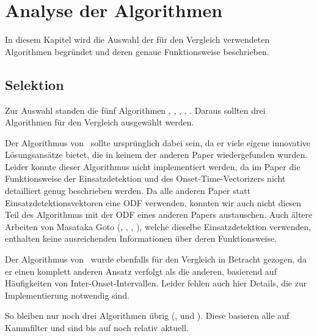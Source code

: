 \chapter{Analyse der Algorithmen}
\label{analyse}
\acresetall

In diesem Kapitel wird die Auswahl der für den Vergleich verwendeten Algorithmen begründet
	und deren genaue Funktionsweise beschrieben.

\section{Selektion}
{
	Zur Auswahl standen die fünf Algorithmen \cite{2000_Di}, \cite{2001_Go}, \cite{2001_BeatThis}, \cite{2009_DaPlSt}, \cite{2011_PlRoSt}.
	Daraus sollten drei Algorithmen für den Vergleich ausgewählt werden.

	Der Algorithmus von~\cite{2001_Go} sollte ursprünglich dabei sein,
		da er viele eigene innovative Lösungsansätze bietet,
		die in keinem der anderen Paper wiedergefunden wurden.
	Leider konnte dieser Algorithmus nicht implementiert werden,
		da im Paper die Funktionsweise der Einsatzdetektion und des Onset-Time-Vectorizers
		nicht detailliert genug beschrieben werden.
	Da alle anderen Paper statt Einsatzdetektionsvektoren eine \ac{ODF} verwenden,
		konnten wir auch nicht diesen Teil des Algorithmus mit der \ac{ODF} eines anderen Papers austauschen.
	Auch ältere Arbeiten von Masataka Goto (\cite{1994_GoMu}, \cite{1995_GoMu1}, \cite{1996_GoMu}, \cite{1997_GoMu2}),
		welche dieselbe Einsatzdetektion verwenden,
		enthalten keine ausreichenden Informationen über deren Funktionsweise.

	Der Algorithmus von~\cite{2000_Di} wurde ebenfalls für den Vergleich in Betracht gezogen,
		da er einen komplett anderen Ansatz verfolgt als die anderen,
		basierend auf Häufigkeiten von Inter-Onset-Intervallen.
	Leider fehlen auch hier Details,
		die zur Implementierung notwendig sind.

	So bleiben nur noch drei Algorithmen übrig (\cite{2001_BeatThis}, \cite{2009_DaPlSt} und \cite{2011_PlRoSt}).
	Diese basieren alle auf Kammfilter und sind bis auf \cite{2001_BeatThis} noch relativ aktuell.
}

